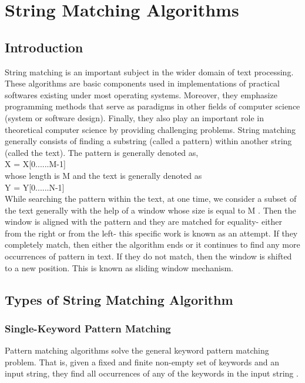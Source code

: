 \documentclass[12pt,a4paper]{report}
\begin{document}
\section{String Matching Algorithms}
\subsection{Introduction}
String matching is an important subject in the wider domain of text processing. These algorithms are basic components used in implementations of practical softwares existing under most operating systems. Moreover, they emphasize programming methods that serve as paradigms in other fields of computer science (system or software design). Finally, they also play an important role in theoretical computer science by providing challenging problems. 
String matching generally consists of finding a substring (called a pattern) within another string (called the text). The pattern is generally denoted as,\\  
                     \hspace{5cm}     X  =  X[0......M-1]\\
whose length is M and the text is generally denoted as\\ 
      \hspace{5cm}                     Y  =  Y[0......N-1]\\
While searching the pattern within the text, at one time, we consider a subset of the text generally with the help of a window whose size is equal to M . Then the window is aligned with the pattern and they are matched for equality- either from the right or from the left- this specific work is known as an attempt. If they completely match, then either the algorithm ends or it continues to find any more occurrences of pattern in text. If they do not match, then the window is shifted to a new position. This is known as sliding window mechanism.
\subsection{Types of String Matching Algorithm}
\subsubsection{Single-Keyword Pattern Matching}
Pattern matching algorithms solve the general keyword pattern matching problem.
That is, given a fixed and finite non-empty set of keywords and an input string,
they find all occurrences of any of the keywords in the input string .
\end{document}

